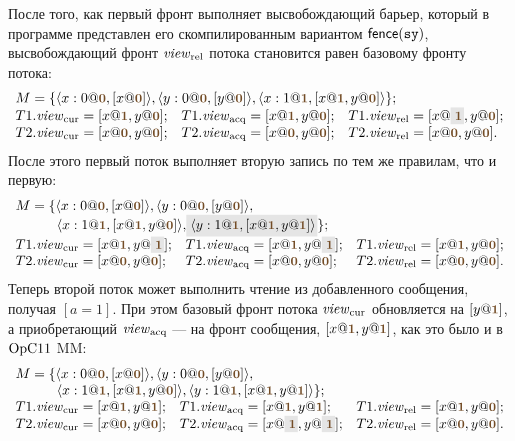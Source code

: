 После того, как первый фронт выполняет высвобождающий барьер, который в программе представлен его скомпилированным
вариантом $\mathsf{fence}({\mathtt{sy}})$, высвобождающий фронт $\mathit{view}_{\mathrm{rel}}$ потока становится равен базовому фронту потока:
\[
\begin{array}{l l l}
\multicolumn{3}{l}{M = \{\angled{x:0@\tstamp{0}, [x@\tstamp{0}]}, \angled{y:0@\tstamp{0}, [y@\tstamp{0}]},
  \angled{x:1@\tstamp{1}, [x@\tstamp{1}, y@\tstamp{0}]} \};} \\
T1.\Rcur = [x@\tstamp{1}, y@\tstamp{0}];           &
T1.\Racq = [x@\tstamp{1}, y@\tstamp{0}];           &
T1.\Rrel = [x@\graybox{\tstamp{1}}, y@\tstamp{0}]; \\
T2.\Rcur = [x@\tstamp{0}, y@\tstamp{0}]; &
T2.\Racq = [x@\tstamp{0}, y@\tstamp{0}]; &
T2.\Rrel = [x@\tstamp{0}, y@\tstamp{0}]. \\
\end{array}
\]
После этого первый поток выполняет вторую запись по тем же правилам, что и первую:
\[
\begin{array}{l l l}
\multicolumn{3}{l}{M = \{\angled{x:0@\tstamp{0}, [x@\tstamp{0}]}, \angled{y:0@\tstamp{0}, [y@\tstamp{0}]},} \\
\multicolumn{3}{l}{
\quad \quad \quad \angled{x:1@\tstamp{1}, [x@\tstamp{1}, y@\tstamp{0}]}, \graybox{\angled{y:1@\tstamp{1}, [x@\tstamp{1}, y@\tstamp{1}]}} \};} \\
T1.\Rcur = [x@\tstamp{1}, y@\graybox{\tstamp{1}}]; &
T1.\Racq = [x@\tstamp{1}, y@\graybox{\tstamp{1}}]; &
T1.\Rrel = [x@\tstamp{1}, y@\tstamp{0}]; \\
T2.\Rcur = [x@\tstamp{0}, y@\tstamp{0}]; &
T2.\Racq = [x@\tstamp{0}, y@\tstamp{0}]; &
T2.\Rrel = [x@\tstamp{0}, y@\tstamp{0}]. \\
\end{array}
\]
Теперь второй поток может выполнить чтение из добавленного сообщения, получая $[a = 1]$.
При этом базовый фронт потока $\mathit{view}_{\mathrm{cur}}$ обновляется на $[y@\tstamp{1}]$, а приобретающий $\mathit{view}_{\mathrm{acq}}$ --- на фронт сообщения,
$[x@\tstamp{1}, y@\tstamp{1}]$, как это было и в $\mathrm{OpC11}$ MM:
\[
\begin{array}{l l l}
\multicolumn{3}{l}{M = \{\angled{x:0@\tstamp{0}, [x@\tstamp{0}]}, \angled{y:0@\tstamp{0}, [y@\tstamp{0}]},} \\
\multicolumn{3}{l}{
\quad \quad \quad \angled{x:1@\tstamp{1}, [x@\tstamp{1}, y@\tstamp{0}]}, \angled{y:1@\tstamp{1}, [x@\tstamp{1}, y@\tstamp{1}]} \};} \\
T1.\Rcur = [x@\tstamp{1}, y@\tstamp{1}]; &
T1.\Racq = [x@\tstamp{1}, y@\tstamp{1}]; &
T1.\Rrel = [x@\tstamp{1}, y@\tstamp{0}]; \\
T2.\Rcur = [x@\tstamp{0}, y@\tstamp{0}]; &
T2.\Racq = [x@\graybox{\tstamp{1}}, y@\graybox{\tstamp{1}}]; &
T2.\Rrel = [x@\tstamp{0}, y@\tstamp{0}]. \\
\end{array}
\]
